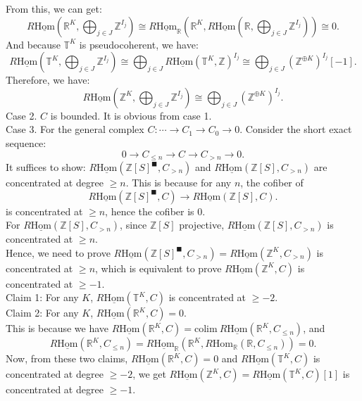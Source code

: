 \documentclass[UTF8,12,a4paper]{ctexart}
\theoremstyle{definition}
\begin{document}
From this, we can get:
$$
R\underline{\text{Hom}}(\mathbb{R}^K,\bigoplus_{j\in J}\mathbb{Z}^{I_j})
\cong R\underline{\text{Hom}}_\mathbb{R} (\mathbb{R}^K,R\underline{\text{Hom}}(\mathbb{R},\bigoplus_{j\in J}\mathbb{Z}^{I_j}))\cong 0.
$$
And because $\mathbb{T}^K$ is pseudocoherent, we have:
$$
R\underline{\text{Hom}}(\mathbb{T}^K,\bigoplus_{j\in J}\mathbb{Z}^{I_j})
\cong \bigoplus_{j\in J} R\underline{\text{Hom}}(\mathbb{T}^K,\mathbb{Z})^{I_j}\cong 
\bigoplus_{j\in J} (\mathbb{Z}^{\oplus K})^{I_j}[-1].
$$
Therefore, we have:
$$
R\underline{\text{Hom}}(\mathbb{Z}^K,\bigoplus_{j\in J}\mathbb{Z}^{I_j})
\cong\bigoplus_{j\in J} (\mathbb{Z}^{\oplus K})^{I_j}.
$$
Case 2. $C$ is bounded. It is obvious from case 1.\\
Case 3. For the general complex $C:\cdots \rightarrow C_1\rightarrow C_0\rightarrow 0.$ Consider the short exact sequence:
$$
0\rightarrow C_{\leq n}\rightarrow C\rightarrow C_{>n}\rightarrow 0.
$$
It suffices to show: $R\underline{\text{Hom}}(\mathbb{Z}[S]^\blacksquare,C_{>n})$ and $R\underline{\text{Hom}}(\mathbb{Z}[S],C_{>n})$ are concentrated at degree $\geq n$. This is because for any $n$, the cofiber of 
$$
R\underline{\text{Hom}}(\mathbb{Z}[S]^\blacksquare,C)\rightarrow R\underline{\text{Hom}}(\mathbb{Z}[S],C).
$$
is concentrated at $\geq n$, hence the cofiber is 0.\\
For $R\underline{\text{Hom}}(\mathbb{Z}[S],C_{>n})$, since $\mathbb{Z}[S] $ projective, $R\underline{\text{Hom}}(\mathbb{Z}[S],C_{>n})$ is concentrated at $\geq n.$\\
Hence, we need to prove $R\underline{\text{Hom}}(\mathbb{Z}[S]^\blacksquare,C_{>n})=
R\underline{\text{Hom}}(\mathbb{Z}^K,C_{>n}) $ is concentrated at $\geq n$, which is equivalent to prove $R\underline{\text{Hom}}(\mathbb{Z}^K,C)$ is concentrated at $\geq -1$.\\
Claim 1: For any $K$, $R\underline{\text{Hom}}(\mathbb{T}^K,C)$ is concentrated at $\geq -2$.\\
Claim 2: For any $K$, $R\underline{\text{Hom}}(\mathbb{R}^K,C)=0.$ \\
This is because we have $R\underline{\text{Hom}}(\mathbb{R}^K,C)=\text{colim}\ R\underline{\text{Hom}}(\mathbb{R}^K,C_{\leq n})$, and 
$$
R\underline{\text{Hom}}(\mathbb{R}^K,C_{\leq n})=
R\underline{\text{Hom}}_\mathbb{R}(\mathbb{R}^K,R\text{Hom}_{\mathbb{R}}(\mathbb{R},C_{\leq n}))=0.
$$
Now, from these two claims, $R\underline{\text{Hom}}(\mathbb{R}^K,C)=0$ and $R\underline{\text{Hom}}(\mathbb{T}^K,C)$ is concentrated at degree $\geq -2$, we get $R\underline{\text{Hom}}(\mathbb{Z}^K,C)=R\underline{\text{Hom}}(\mathbb{T}^K,C)[1]$ is concentrated at degree $\geq -1$.\\
\end{document}
